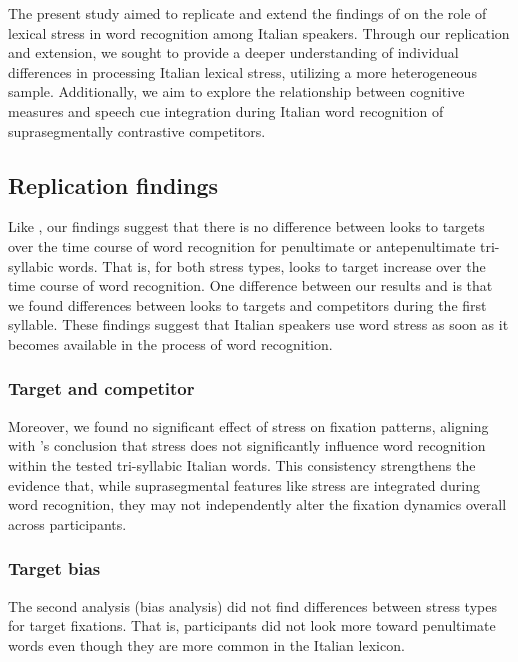 
The present study aimed to replicate and extend the findings of \cite{Sulpizio_McQueen_2012} on the role of lexical stress in word recognition among Italian speakers. Through our replication and extension, we sought to provide a deeper understanding of individual differences in processing Italian lexical stress, utilizing a more heterogeneous sample. Additionally, we aim to explore the relationship between cognitive measures and speech cue integration during Italian word recognition of suprasegmentally contrastive competitors.

\subsection{Replication findings}
Like \cite{Sulpizio_McQueen_2012}, our findings suggest that there is no difference between looks to targets over the time course of word recognition for penultimate or antepenultimate tri-syllabic words. That is, for both stress types, looks to target increase over the time course of word recognition. One difference between our results and \cite{Sulpizio_McQueen_2012} is that we found differences between looks to targets and competitors during the first syllable. These findings suggest that Italian speakers use word stress as soon as it becomes available in the process of word recognition. 

\subsubsection{Target and competitor}

Moreover, we found no significant effect of stress on fixation patterns, aligning with \cite{Sulpizio_McQueen_2012}'s conclusion that stress does not significantly influence word recognition within the tested tri-syllabic Italian words. This consistency strengthens the evidence that, while suprasegmental features like stress are integrated during word recognition, they may not independently alter the fixation dynamics overall across participants.

\subsubsection{Target bias}

The second analysis (bias analysis) did not find differences between stress types for target fixations. That is, participants did not look more toward penultimate words even though they are more common in the Italian lexicon. 

